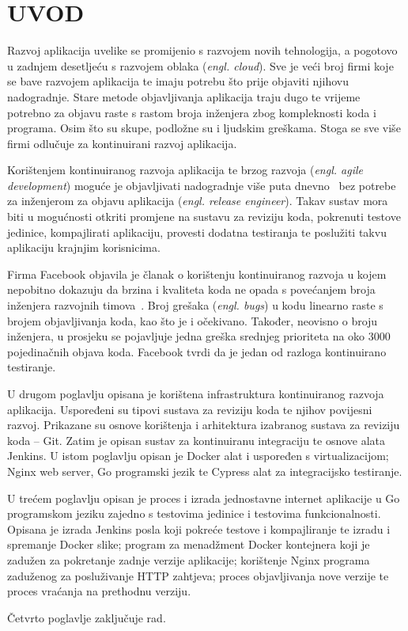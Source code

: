 \chapter{UVOD}
Razvoj aplikacija uvelike se promijenio s razvojem novih tehnologija, a pogotovo u zadnjem
desetljeću s razvojem oblaka (\textit{engl. cloud}). Sve je veći broj firmi koje se bave razvojem
aplikacija te imaju potrebu što prije objaviti njihovu nadogradnje. Stare metode objavljivanja
aplikacija traju dugo te vrijeme potrebno za objavu raste s rastom broja inženjera zbog kompleknosti
koda i programa. Osim što su skupe, podložne su i ljudskim greškama. Stoga se sve više firmi
odlučuje za kontinuirani razvoj aplikacija.

Korištenjem kontinuiranog razvoja aplikacija te brzog razvoja (\textit{engl. agile development})
moguće je objavljivati nadogradnje više puta dnevno~\citep{abrahamsson2017agile} bez potrebe za
inženjerom za objavu aplikacija (\textit{engl. release engineer}). Takav sustav mora biti u
mogućnosti otkriti promjene na sustavu za reviziju koda, pokrenuti testove jedinice, kompajlirati
aplikaciju, provesti dodatna testiranja te poslužiti takvu aplikaciju krajnjim korisnicima.

Firma Facebook objavila je članak o korištenju kontinuiranog razvoja u kojem nepobitno dokazuju da
brzina i kvaliteta koda ne opada s povećanjem broja inženjera razvojnih
timova~\citep{rossi2016continuous}. Broj grešaka (\textit{engl. bugs}) u kodu linearno raste s
brojem objavljivanja koda, kao što je i očekivano. Također, neovisno o broju inženjera, u prosjeku
se pojavljuje jedna greška srednjeg prioriteta na oko 3000 pojedinačnih objava koda. Facebook tvrdi
da je jedan od razloga kontinuirano testiranje.


U drugom poglavlju opisana je korištena infrastruktura kontinuiranog razvoja aplikacija. Uspoređeni
su tipovi sustava za reviziju koda te njihov povijesni razvoj. Prikazane su osnove korištenja i
arhitektura izabranog sustava za reviziju koda -- Git. Zatim je opisan sustav za kontinuiranu
integraciju te osnove alata Jenkins. U istom poglavlju opisan je Docker alat i uspoređen s
virtualizacijom; Nginx web server, Go programski jezik te Cypress alat za integracijsko testiranje.

U trećem poglavlju opisan je proces i izrada jednostavne internet aplikacije u Go programskom jeziku
zajedno s testovima jedinice i testovima funkcionalnosti. Opisana je izrada Jenkins posla koji
pokreće testove i kompajliranje te izradu i spremanje Docker slike; program za
menadžment Docker kontejnera koji je zadužen za pokretanje zadnje verzije aplikacije; korištenje
Nginx programa zaduženog za posluživanje HTTP zahtjeva; proces objavljivanja nove verzije te proces
vraćanja na prethodnu verziju.

Četvrto poglavlje zaključuje rad.
